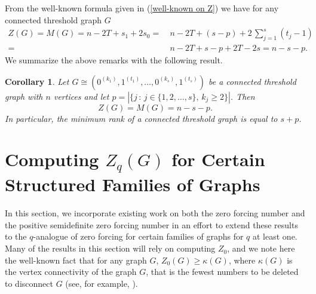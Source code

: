 \documentclass[3p,times,12pt]{article}
\newtheorem{lemma}[theorem]{Lemma}
\newtheorem{cor}[theorem]{Corollary}
\DeclareMathOperator{\tw}{tw}
\begin{document}
 
 From the well-known formula given in (\ref{well-known on Z}) we have for any connected threshold graph $G$
 \begin{align}
 Z(G)=M(G)= n-2T+s_1+2s_0=&~ n-2T+(s-p)+2\,\sum_{j=1}^s (t_j-1)\nonumber\\
                =&~ n-2T+s-p+2T-2s=n-s-p.
 \end{align} 
We summarize the above remarks with the following result.
\begin{cor}
 Let $G\cong (0^{(k_1)}, 1^{(t_1)}, \ldots,0^{(k_s)}, 1^{(t_s)})$ be a connected threshold graph with $n$ vertices and let $p=|\{j\,:\, j\in \{1,2,\ldots,s\},\,k_j\ge 2\}|$. Then 
 $$Z(G)=M(G)=n-s-p.$$ In particular, the minimum rank of a connected threshold graph is equal to $s+p$.
\end{cor}

\section{Computing $Z_{q}(G)$ for Certain Structured Families of Graphs}

In this section, we incorporate existing work on both the zero forcing number and the positive semidefinite zero forcing number in an effort to extend these results to the $q$-analogue of zero forcing for certain families of graphs for $q$ at least one. Many of the results in this section will rely on computing $Z_0$, and we note here the well-known fact that for any graph $G$, $Z_0(G) \geq\kappa(G)$, where 
$\kappa(G)$ is the vertex connectivity of the graph $G$, that is the fewest numbers to be deleted to disconnect $G$ (see, for example, \cite{barioli2013parameters}).


	
	
	
%
\end{document}
